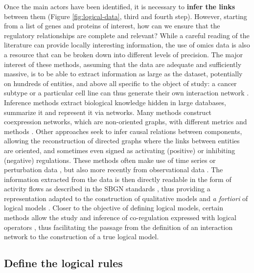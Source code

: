 \documentclass[a4paper,12pt,twoside,onecolumn,openright,final,oldfontcommands]{memoir}
\begin{document}
Once the main actors have been identified, it is necessary to
\textbf{infer the links} between them (Figure \ref{fig:logical-data},
third and fourth step). However, starting from a list of genes and
proteins of interest, how can we ensure that the regulatory
relationships are complete and relevant? While a careful reading of the
literature can provide locally interesting information, the use of omics
data is also a resource that can be broken down into different levels of
precision. The major interest of these methods, assuming that the data
are adequate and sufficiently massive, is to be able to extract
information as large as the dataset, potentially on hundreds of
entities, and above all specific to the object of study: a cancer
subtype or a particular cell line can thus generate their own
interaction network \citep{lefebvre2010human}. Inference methods extract
biological knowledge hidden in large databases, summarize it and
represent it via networks. Many methods construct coexpression networks,
which are non-oriented graphs, with different metrics and methods
\citep{margolin2006aracne, vert2007new}. Other approaches seek to infer
causal relations between components, allowing the reconstruction of
directed graphs where the links between entities are oriented, and
sometimes even signed as activating (positive) or inhibiting (negative)
regulations. These methods often make use of time series
\citep{hill2016inferring} or perturbation data
\citep{meinshausen2016methods}, but also more recently from
observational data \citep{verny2017learning}. The information extracted
from the data is then directly readable in the form of activity flows as
described in the SBGN standards \citep{novere2009systems}, thus
providing a representation adapted to the construction of qualitative
models and \emph{a fortiori} of logical models
\citep{le2015quantitative}. Closer to the objective of defining logical
models, certain methods allow the study and inference of co-regulation
expressed with logical operators \citep{elati2007licorn}, thus
facilitating the passage from the definition of an interaction network
to the construction of a true logical model.

\subsection{Define the logical rules}\label{define-the-logical-rules}
\end{document}
